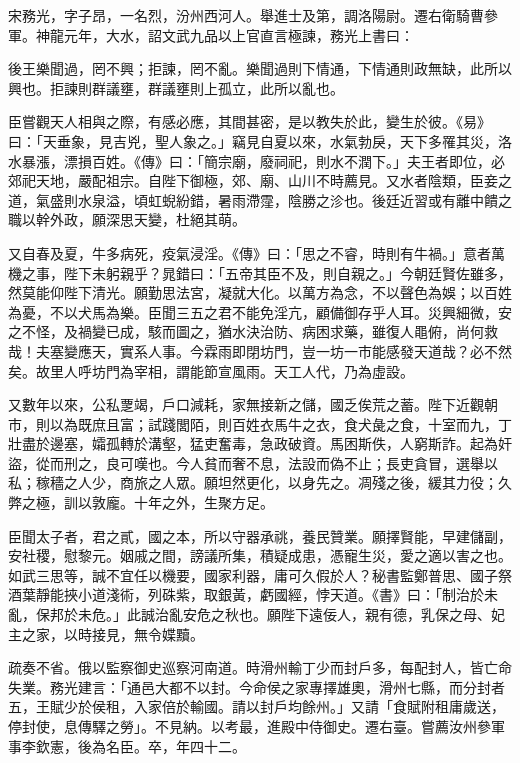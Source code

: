 \begin{pinyinscope}
 宋務光，字子昂，一名烈，汾州西河人。舉進士及第，調洛陽尉。遷右衛騎曹參軍。神龍元年，大水，詔文武九品以上官直言極諫，務光上書曰：



 後王樂聞過，罔不興；拒諫，罔不亂。樂聞過則下情通，下情通則政無缺，此所以興也。拒諫則群議壅，群議壅則上孤立，此所以亂也。



 臣嘗觀天人相與之際，有感必應，其間甚密，是以教失於此，變生於彼。《易》曰：「天垂象，見吉兇，聖人象之。」竊見自夏以來，水氣勃戾，天下多罹其災，洛水暴漲，漂損百姓。《傳》曰：「簡宗廟，廢祠祀，則水不潤下。」夫王者即位，必郊祀天地，嚴配祖宗。自陛下御極，郊、廟、山川不時薦見。又水者陰類，臣妾之道，氣盛則水泉溢，頃虹蜺紛錯，暑雨滯霪，陰勝之沴也。後廷近習或有離中饋之職以幹外政，願深思天變，杜絕其萌。



 又自春及夏，牛多病死，疫氣浸淫。《傳》曰：「思之不睿，時則有牛禍。」意者萬機之事，陛下未躬親乎？晁錯曰：「五帝其臣不及，則自親之。」今朝廷賢佐雖多，然莫能仰陛下清光。願勤思法宮，凝就大化。以萬方為念，不以聲色為娛；以百姓為憂，不以犬馬為樂。臣聞三五之君不能免淫亢，顧備御存乎人耳。災興細微，安之不怪，及禍變已成，駭而圖之，猶水決治防、病困求藥，雖復人黽俯，尚何救哉！夫塞變應天，實系人事。今霖雨即閉坊門，豈一坊一市能感發天道哉？必不然矣。故里人呼坊門為宰相，謂能節宣風雨。天工人代，乃為虛設。



 又數年以來，公私覂竭，戶口減耗，家無接新之儲，國乏俟荒之蓄。陛下近觀朝市，則以為既庶且富；試踐閭陌，則百姓衣馬牛之衣，食犬彘之食，十室而九，丁壯盡於邊塞，孀孤轉於溝壑，猛吏奮毒，急政破資。馬困斯佚，人窮斯詐。起為奸盜，從而刑之，良可嘆也。今人貧而奢不息，法設而偽不止；長吏貪冒，選舉以私；稼穡之人少，商旅之人眾。願坦然更化，以身先之。凋殘之後，緩其力役；久弊之極，訓以敦龐。十年之外，生聚方足。



 臣聞太子者，君之貳，國之本，所以守器承祧，養民贊業。願擇賢能，早建儲副，安社稷，慰黎元。姻戚之間，謗議所集，積疑成患，憑寵生災，愛之適以害之也。如武三思等，誠不宜任以機要，國家利器，庸可久假於人？秘書監鄭普思、國子祭酒葉靜能挾小道淺術，列硃紫，取銀黃，虧國經，悖天道。《書》曰：「制治於未亂，保邦於未危。」此誠治亂安危之秋也。願陛下遠佞人，親有德，乳保之母、妃主之家，以時接見，無令媟黷。



 疏奏不省。俄以監察御史巡察河南道。時滑州輸丁少而封戶多，每配封人，皆亡命失業。務光建言：「通邑大都不以封。今命侯之家專擇雄奧，滑州七縣，而分封者五，王賦少於侯租，入家倍於輸國。請以封戶均餘州。」又請「食賦附租庸歲送，停封使，息傳驛之勞」。不見納。以考最，進殿中侍御史。遷右臺。嘗薦汝州參軍事李欽憲，後為名臣。卒，年四十二。




\end{pinyinscope}
